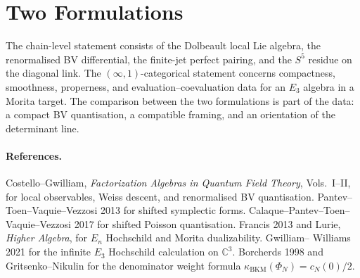 \documentclass[11pt]{amsart}
\providecommand{\C}{\mathbb{C}}
\providecommand{\kBKM}{\kappa_{\mathrm{BKM}}}
\theoremstyle{plain}
\theoremstyle{definition}
\theoremstyle{remark}
\begin{document}
\section{Two Formulations}

The chain-level statement consists of the Dolbeault local Lie algebra,
the renormalised BV differential, the finite-jet perfect pairing, and
the $S^5$ residue on the diagonal link. The $(\infty,1)$-categorical
statement concerns compactness, smoothness, properness, and
evaluation--coevaluation data for an $E_3$ algebra in a Morita target.
The comparison between the two formulations is part of the data: a
compact BV quantisation, a compatible framing, and an orientation of the
determinant line.

\paragraph{References.}
Costello--Gwilliam, \emph{Factorization Algebras in Quantum Field
Theory}, Vols.~I--II, for local observables, Weiss descent, and
renormalised BV quantisation. Pantev--Toen--Vaquie--Vezzosi 2013 for
shifted symplectic forms. Calaque--Pantev--Toen--Vaquie--Vezzosi 2017
for shifted Poisson quantisation. Francis 2013 and Lurie, \emph{Higher
Algebra}, for $E_n$ Hochschild and Morita dualizability. Gwilliam--
Williams 2021 for the infinite $E_3$ Hochschild calculation on
$\C^3$. Borcherds 1998 and Gritsenko--Nikulin for the denominator
weight formula $\kBKM(\Phi_N)=c_N(0)/2$.
\end{document}
